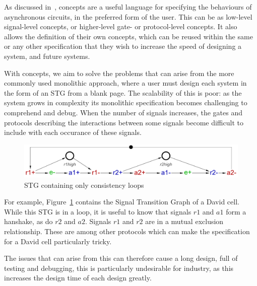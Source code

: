 \documentclass[british,conference,compsoc]{IEEEtran}
\begin{document}
As discussed in~\cite{2015_Beaumont_MEMOCODE}, concepts are a useful language 
for specifying the behaviours of asynchronous circuits, in the preferred form 
of the user. This can be as low-level signal-level concepts, or higher-level 
gate- or protocol-level concepts. It also allows the definition of their own 
concepts, which can be reused within the same or any other specification that 
they wish to increase the speed of designing a system, and future systems. 

With concepts, we aim to solve the problems that can arise from the more 
commonly used monolithic approach, where a user must design each system in the 
form of an STG from a blank page. The scalability of this is poor: as the 
system grows in complexity its monolithic specification becomes challenging to 
comprehend and debug. When the number of signals increases, the gates and 
protocols describing the interactions between some signals become difficult to
include with each occurance of these signals. 

\begin{figure}[h]
\vspace{-3mm}
\begin{centering}
\includegraphics[scale=0.25]{Images/DC-stg.pdf}
\par\end{centering}
\protect\caption{\label{fig:DC-stg} STG containing only consistency loops}
\vspace{-1mm}
\end{figure}

For example, Figure~\ref{fig:DC-stg} contains the Signal Transition Graph of a
David cell. While this STG is in a loop, it is useful to know that signals $r1$ 
and $a1$ form a hanshake, as do $r2$ and $a2$. Signals $r1$ and $r2$ are in a
mutual exclusion relationship. These are among other protocols which can make
the specification for a David cell particularly tricky. 


The issues that can arise from this can therefore cause a long design, full of 
testing and debugging, this is particularly undesirable for industry, as 
this increases the design time of each design greatly. 
\end{document}

